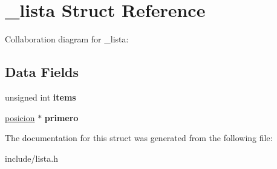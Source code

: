 \hypertarget{struct__lista}{}\section{\+\_\+lista Struct Reference}
\label{struct__lista}


Collaboration diagram for \+\_\+lista\+:
\subsection*{Data Fields}
\begin{DoxyCompactItemize}
\item 
\mbox{\label{struct__lista_aea288b12e95a0a1aa251ead03fc806da}} 
unsigned int {\bfseries items}
\item 
\mbox{\label{struct__lista_ad90a35547ad2782e436d972aece967fc}} 
\hyperlink{struct__posicion}{posicion} $\ast$ {\bfseries primero}
\end{DoxyCompactItemize}


The documentation for this struct was generated from the following file\+:\begin{DoxyCompactItemize}
\item 
include/lista.\+h\end{DoxyCompactItemize}

